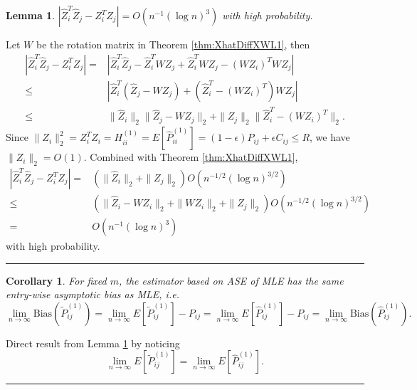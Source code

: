 \documentclass[a4paper]{article}
\newenvironment{proof}{{\bf Proof:  }}{\hfill\rule{2mm}{2mm}}
\newtheorem{lemma}[fact]{Lemma}
\newtheorem{corollary}[fact]{Corollary}
\begin{document}
\begin{lemma}
\label{lemma:1stMomentPhatDiffL1}
$\left|  \hat{Z}_i^T \hat{Z}_j - Z_i^T Z_j \right| = O(n^{-1} (\log n)^{3})$ with high probability.
\end{lemma}
\begin{proof}
Let $W$ be the rotation matrix in Theorem \ref{thm:XhatDiffXWL1}, then
\begin{align*}
	\left|  \hat{Z}_i^T \hat{Z}_j - Z_i^T Z_j \right|
    = & \left| \hat{Z}_i^T \hat{Z}_j - \hat{Z}_i^T W Z_j + \hat{Z}_i^T W Z_j - (W Z_i)^T W Z_j \right| \\
    \le & \left| \hat{Z}_i^T (\hat{Z}_j - W Z_j) + (\hat{Z}_i^T - (W Z_i)^T) W Z_j \right| \\
    \le & \|\hat{Z}_i\|_2 \|\hat{Z}_j - W Z_j\|_2 + \|Z_j\|_2 \|\hat{Z}_i^T - (W Z_i)^T\|_2.
\end{align*}
Since $\|Z_i\|_2^2 = Z_i^T Z_i = H^{(1)}_{ii} =  E[\hat{P}^{(1)}_{ii}] = (1-\epsilon) P_{ij} + \epsilon C_{ij} \le R$, we have $\|Z_i\|_2 = O(1)$.
Combined with Theorem \ref{thm:XhatDiffXWL1},
\begin{align*}
    \left|  \hat{Z}_i^T \hat{Z}_j - Z_i^T Z_j \right|
    = & (\|\hat{Z}_i\|_2 + \|Z_j\|_2) O(n^{-1/2} (\log n)^{3/2}) \\
    \le & (\|\hat{Z}_i - W Z_i\|_2 + \|W Z_i\|_2 + \|Z_j\|_2) O(n^{-1/2} (\log n)^{3/2}) \\
    = & O(n^{-1} (\log n)^{3})
\end{align*}
with high probability.
\end{proof}




\begin{corollary}
\label{cor:L1Consistent}
For fixed $m$, the estimator based on ASE of MLE has the same entry-wise asymptotic bias as MLE, i.e.
\[
	\lim_{n \to \infty} \mathrm{Bias}(\widetilde{P}_{ij}^{(1)}) = \lim_{n \to \infty} E[\widetilde{P}_{ij}^{(1)}] - P_{ij} = \lim_{n \to \infty} E[\hat{P}^{(1)}_{ij}] - P_{ij}
    = \lim_{n \to \infty} \mathrm{Bias}(\hat{P}_{ij}^{(1)}).
\]
\end{corollary}
\begin{proof}
Direct result from Lemma \ref{lemma:1stMomentPhatDiffL1} by noticing
\[
	\lim_{n \to \infty} E[\widetilde{P}_{ij}^{(1)}] = \lim_{n \to \infty} E[\hat{P}^{(1)}_{ij}].
\]
\end{proof}
\end{document}
